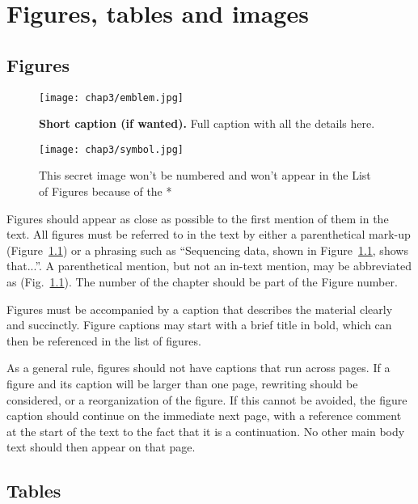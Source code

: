 

\chapter{Figures, tables and images} \label{chap-3}

\section{Figures}

\begin{figure}
\center
\texttt{[image: chap3/emblem.jpg]} 
\caption[Short caption for List of Figures]{{\bfseries Short caption (if wanted).} Full caption with all the details here.}
\label{fig-example}
\end{figure}

\begin{figure}
\center
\texttt{[image: chap3/symbol.jpg]} 
\caption*{This secret image won't be numbered and won't appear in the List of Figures because of the *}
\end{figure}


Figures should appear as close as possible to the first mention of them in the text. All figures must be referred to in the text by either a parenthetical mark-up (Figure~\ref{fig-example}) or a phrasing such as ``Sequencing data, shown in Figure~\ref{fig-example}, shows that...''.  A parenthetical mention, but not an in-text mention, may be abbreviated as (Fig.~\ref{fig-example}).  The number of the chapter should be part of the Figure number.

Figures must be accompanied by a caption that describes the material clearly and succinctly. Figure captions may start with a brief title in bold, which can then be referenced in the list of figures. 

As a general rule, figures should not have captions that run across pages.  If a figure and its caption will be larger than one page, rewriting should be considered, or a reorganization of the figure.  If this cannot be avoided, the figure caption should continue on the immediate next page, with a reference comment at the start of the text to the fact that it is a continuation.  No other main body text should then appear on that page.

\section{Tables}

